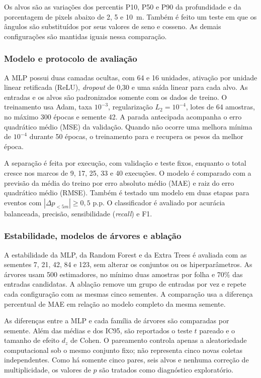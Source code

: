 \documentclass[article,a4paper,12pt,brazil,sumario=tradicional]{abntex2}
\begin{document}
Os alvos são as variações dos percentis P10, P50 e P90 da profundidade e da porcentagem de pixels abaixo de 2, 5 e 10~m. Também é feito um teste em que os ângulos são substituídos por seus valores de seno e cosseno. As demais configurações são mantidas iguais nessa comparação.

\subsubsection{Modelo e protocolo de avaliação}

A MLP possui duas camadas ocultas, com 64 e 16 unidades, ativação por unidade linear retificada (ReLU), \textit{dropout} de 0,30 e uma saída linear para cada alvo. As entradas e os alvos são padronizados somente com os dados de treino. O treinamento usa Adam, taxa $10^{-3}$, regularização $L_2=10^{-4}$, lotes de 64 amostras, no máximo 300 épocas e semente 42. A parada antecipada acompanha o erro quadrático médio (MSE) da validação. Quando não ocorre uma melhora mínima de $10^{-4}$ durante 50 épocas, o treinamento para e recupera os pesos da melhor época.

A separação é feita por execução, com validação e teste fixos, enquanto o total cresce nos marcos de 9, 17, 25, 33 e 40 execuções. O modelo é comparado com a previsão da média do treino por erro absoluto médio (MAE) e raiz do erro quadrático médio (RMSE). Também é testado um modelo em duas etapas para eventos com $|\Delta p_{<5m}|\geq0{,}5$ p.p. O classificador é avaliado por acurácia balanceada, precisão, sensibilidade (\textit{recall}) e F1.

\subsubsection{Estabilidade, modelos de árvores e ablação}

A estabilidade da MLP, da Random Forest e da Extra Trees é avaliada com as sementes 7, 21, 42, 84 e 123, sem alterar os conjuntos ou os hiperparâmetros. As árvores usam 500 estimadores, no mínimo duas amostras por folha e 70\% das entradas candidatas. A ablação remove um grupo de entradas por vez e repete cada configuração com as mesmas cinco sementes. A comparação usa a diferença percentual de MAE em relação ao modelo completo da mesma semente.

As diferenças entre a MLP e cada família de árvores são comparadas por semente. Além das médias e dos IC95, são reportados o teste $t$ pareado e o tamanho de efeito $d_z$ de Cohen. O pareamento controla apenas a aleatoriedade computacional sob o mesmo conjunto fixo; não representa cinco novas coletas independentes. Como há somente cinco pares, seis alvos e nenhuma correção de multiplicidade, os valores de $p$ são tratados como diagnóstico exploratório.
\end{document}
